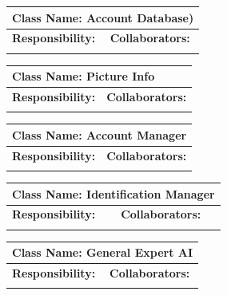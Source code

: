 \documentclass[]{article}
\begin{document}
\begin{itemize}

	\begin{table}
		\centering
		\begin{tabular}{|p{5cm}|p{5cm}|}
		\hline 
		 \multicolumn{2}{|l|}{\textbf{Class Name:} Account Database)} \\
		\hline
		\textbf{Responsibility:} & \textbf{Collaborators:} \\
		\hline
		\vspace{1in} & \\
		\hline
		\end{tabular}
	\end{table}

	\begin{table}
		\centering
		\begin{tabular}{|p{5cm}|p{5cm}|}
		\hline 
		 \multicolumn{2}{|l|}{\textbf{Class Name:} Picture Info} \\
		\hline
		\textbf{Responsibility:} & \textbf{Collaborators:} \\
		\hline
		\vspace{1in} & \\
		\hline
		\end{tabular}
	\end{table}

	\begin{table}
		\centering
		\begin{tabular}{|p{5cm}|p{5cm}|}
		\hline 
		 \multicolumn{2}{|l|}{\textbf{Class Name:} Account Manager} \\
		\hline
		\textbf{Responsibility:} & \textbf{Collaborators:} \\
		\hline
		\vspace{1in} & \\
		\hline
		\end{tabular}
	\end{table}

	\begin{table}
		\centering
		\begin{tabular}{|p{5cm}|p{5cm}|}
		\hline 
		 \multicolumn{2}{|l|}{\textbf{Class Name:} Identification Manager} \\
		\hline
		\textbf{Responsibility:} & \textbf{Collaborators:} \\
		\hline
		\vspace{1in} & \\
		\hline
		\end{tabular}
	\end{table}

	\begin{table}
		\centering
		\begin{tabular}{|p{5cm}|p{5cm}|}
		\hline 
		 \multicolumn{2}{|l|}{\textbf{Class Name:} General Expert AI} \\
		\hline
		\textbf{Responsibility:} & \textbf{Collaborators:} \\
		\hline
		\vspace{1in} & \\
		\hline
		\end{tabular}
	\end{table}


\end{itemize}
\end{document}

